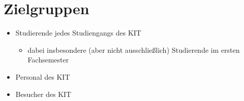 \section{Zielgruppen}

\begin{itemize}
	\item Studierende jedes Studiengangs des \Gls{KIT}
	\begin{itemize}
		\item dabei insbesondere (aber nicht ausschließlich) Studierende im ersten Fachsemester
	\end{itemize}
	\item Personal des \Gls{KIT}
	\item Besucher des \Gls{KIT}
\end{itemize}